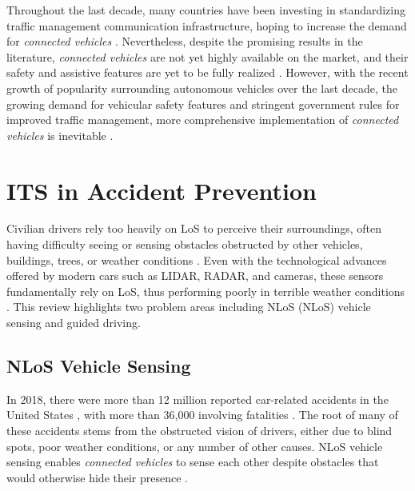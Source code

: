 Throughout the last decade, many countries have been investing in standardizing traffic management communication infrastructure, hoping to increase the demand for \textit{connected vehicles} \cite{Huang2009}. Nevertheless, despite the promising results in the literature, \textit{connected vehicles} are not yet highly available on the market, and their safety and assistive features are yet to be fully realized \cite{Bahaaldin2017, Ahmed2017}. However, with the recent growth of popularity surrounding autonomous vehicles over the last decade, the growing demand for vehicular safety features and stringent government rules for improved traffic management, more comprehensive implementation of \textit{connected vehicles} is inevitable \cite{Sukru2020, Global-V2X-Market2020, Lyu2020}.


\section{ITS in Accident Prevention}
Civilian drivers rely too heavily on \acrshort{LoS} to perceive their surroundings, often having difficulty seeing or sensing obstacles obstructed by other vehicles, buildings, trees, or weather conditions \cite{Sukru2020}. Even with the technological advances offered by modern cars such as \gls{LIDAR}, \gls{RADAR}, and cameras, these sensors fundamentally rely on \acrshort{LoS}, thus performing poorly in terrible weather conditions \cite{Sukru2020}. This review highlights two problem areas including \acrlong{NLoS} (\acrshort{NLoS}) vehicle sensing and guided driving.


\subsection{NLoS Vehicle Sensing}
In 2018, there were more than 12 million reported car-related accidents in the United States \cite{Wagner2020}, with more than 36,000 involving fatalities \cite{Wagner2020}. The root of many of these accidents stems from the obstructed vision of drivers, either due to blind spots, poor weather conditions, or any number of other causes. \acrshort{NLoS} vehicle sensing enables \textit{connected vehicles} to sense each other despite obstacles that would otherwise hide their presence \cite{Subedi2020}.


